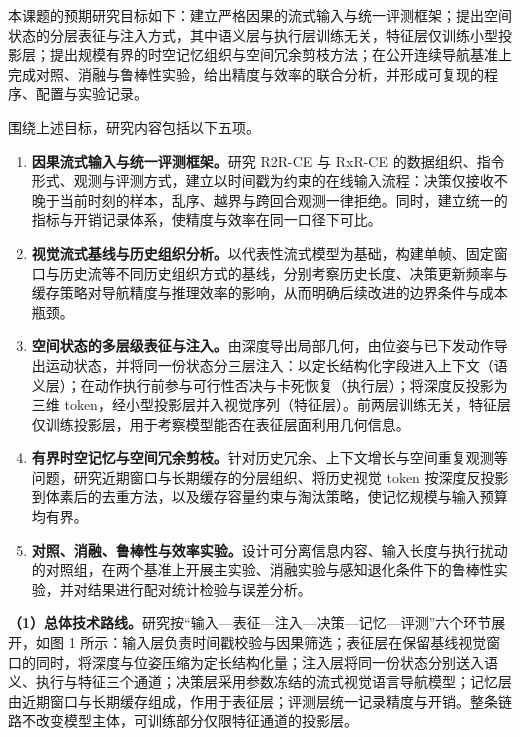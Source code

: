 
本课题的预期研究目标如下：建立严格因果的流式输入与统一评测框架；提出空间状态的分层表征与注入方式，其中语义层与执行层训练无关，特征层仅训练小型投影层；提出规模有界的时空记忆组织与空间冗余剪枝方法；在公开连续导航基准上完成对照、消融与鲁棒性实验，给出精度与效率的联合分析，并形成可复现的程序、配置与实验记录。

围绕上述目标，研究内容包括以下五项。

\begin{enumerate}
  \item \textbf{因果流式输入与统一评测框架。}研究 R2R-CE 与 RxR-CE 的数据组织、指令形式、观测与评测方式，建立以时间戳为约束的在线输入流程：决策仅接收不晚于当前时刻的样本，乱序、越界与跨回合观测一律拒绝。同时，建立统一的指标与开销记录体系，使精度与效率在同一口径下可比。
  \item \textbf{视觉流式基线与历史组织分析。}以代表性流式模型为基础，构建单帧、固定窗口与历史流等不同历史组织方式的基线，分别考察历史长度、决策更新频率与缓存策略对导航精度与推理效率的影响，从而明确后续改进的边界条件与成本瓶颈。
  \item \textbf{空间状态的多层级表征与注入。}由深度导出局部几何，由位姿与已下发动作导出运动状态，并将同一份状态分三层注入：以定长结构化字段进入上下文（语义层）；在动作执行前参与可行性否决与卡死恢复（执行层）；将深度反投影为三维 token，经小型投影层并入视觉序列（特征层）。前两层训练无关，特征层仅训练投影层，用于考察模型能否在表征层面利用几何信息。
  \item \textbf{有界时空记忆与空间冗余剪枝。}针对历史冗余、上下文增长与空间重复观测等问题，研究近期窗口与长期缓存的分层组织、将历史视觉 token 按深度反投影到体素后的去重方法，以及缓存容量约束与淘汰策略，使记忆规模与输入预算均有界。
  \item \textbf{对照、消融、鲁棒性与效率实验。}设计可分离信息内容、输入长度与执行扰动的对照组，在两个基准上开展主实验、消融实验与感知退化条件下的鲁棒性实验，并对结果进行配对统计检验与误差分析。
\end{enumerate}


\textbf{（1）总体技术路线。}研究按“输入—表征—注入—决策—记忆—评测”六个环节展开，如图 1 所示：输入层负责时间戳校验与因果筛选；表征层在保留基线视觉窗口的同时，将深度与位姿压缩为定长结构化量；注入层将同一份状态分别送入语义、执行与特征三个通道；决策层采用参数冻结的流式视觉语言导航模型；记忆层由近期窗口与长期缓存组成，作用于表征层；评测层统一记录精度与开销。整条链路不改变模型主体，可训练部分仅限特征通道的投影层。

